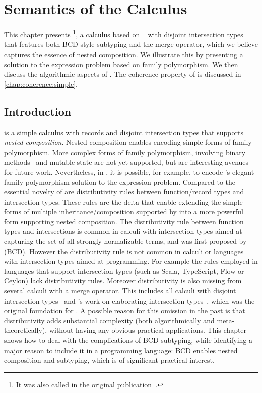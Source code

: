 
\chapter{Semantics of the \namee Calculus}
\label{chap:nested}

This chapter presents \namee\footnote{It was also called \name in the original publication~\citep{bi_et_al:LIPIcs:2018:9227}.}, a calculus based on \oname~\citep{oliveira2016disjoint} with disjoint intersection types that
features both BCD-style subtyping and the merge operator, which we believe
captures the essence of nested composition. We illustrate this by presenting a
solution to the expression problem based on family polymorphism. We then discuss
the algorithmic aspects of \namee. The coherence property of \namee is discussed
in \cref{chap:coherence:simple}.

\section{Introduction}

\namee is a simple calculus with records and disjoint intersection types that
supports \emph{nested composition}. Nested composition enables encoding simple
forms of family polymorphism. More complex forms of family polymorphism,
involving binary methods~\citep{bruce1995binary} and mutable state are not yet
supported, but are interesting avenues for future work. Nevertheless, in \namee,
it is possible, for example, to encode \citeauthor{ernst2004expression}'s elegant family-polymorphism
solution to the expression problem. Compared to \oname the essential novelty of
\namee are distributivity rules between function/record types and intersection
types. These rules are the delta that enable extending the simple forms of
multiple inheritance/composition supported by \oname into a more powerful form
supporting nested composition. The distributivity rule between function types
and intersections is common in calculi with intersection types aimed at
capturing the set of all strongly normalizable terms, and was first proposed by
\citet{Barendregt_1983} (BCD). However the distributivity rule is not common in
calculi or languages with intersection types aimed at programming. For example
the rules employed in languages that support intersection types (such as Scala,
TypeScript, Flow or Ceylon) lack distributivity rules. Moreover distributivity
is also missing from several calculi with a merge operator. This includes all
calculi with disjoint intersection types~\citep{oliveira2016disjoint, alpuimdisjoint}
and \citeauthor{dunfield2014elaborating}'s work on elaborating
intersection types~\citep{dunfield2014elaborating}, which was the original
foundation for \oname. A possible reason for this omission in the past is that
distributivity adds substantial complexity (both algorithmically and
meta-theoretically), without having any obvious practical applications. This
chapter shows how to deal with the complications of BCD subtyping, while
identifying a major reason to include it in a programming language: BCD enables
nested composition and subtyping, which is of significant practical interest.

